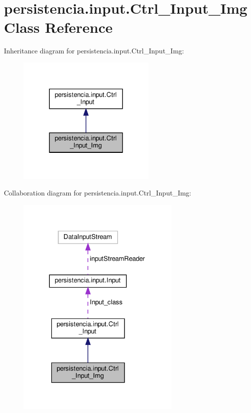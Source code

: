 \hypertarget{classpersistencia_1_1input_1_1Ctrl__Input__Img}{}\section{persistencia.\+input.\+Ctrl\+\_\+\+Input\+\_\+\+Img Class Reference}
\label{classpersistencia_1_1input_1_1Ctrl__Input__Img}


Inheritance diagram for persistencia.\+input.\+Ctrl\+\_\+\+Input\+\_\+\+Img\+:\nopagebreak
\begin{figure}[H]
\begin{center}
\leavevmode
\includegraphics[width=192pt]{classpersistencia_1_1input_1_1Ctrl__Input__Img__inherit__graph}
\end{center}
\end{figure}


Collaboration diagram for persistencia.\+input.\+Ctrl\+\_\+\+Input\+\_\+\+Img\+:\nopagebreak
\begin{figure}[H]
\begin{center}
\leavevmode
\includegraphics[width=227pt]{classpersistencia_1_1input_1_1Ctrl__Input__Img__coll__graph}
\end{center}
\end{figure}
